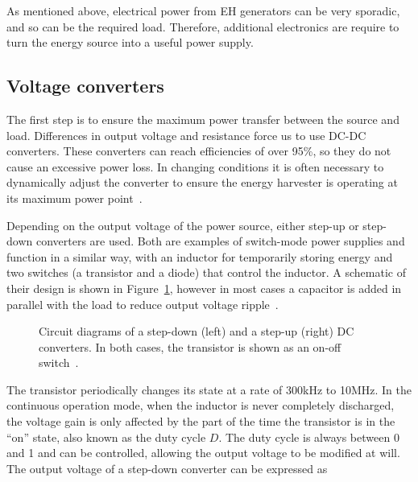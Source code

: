 \documentclass[a4paper,10pt]{article}
\begin{document}
As mentioned above, electrical power from \ac{EH} generators can be very sporadic, and so can be the required load. Therefore, additional electronics are require to turn the energy source into a useful power supply. 

\subsection{Voltage converters}

The first step is to ensure the maximum power transfer between the source and load. Differences in output voltage and resistance force us to use DC-DC converters. These converters can reach efficiencies of over 95\%, so they do not cause an excessive power loss. In changing conditions it is often necessary to dynamically adjust the converter to ensure the energy harvester is operating at its maximum power point~\cite{solar-mppt-ieee}. 

Depending on the output voltage of the power source, either step-up or step-down converters are used. Both are examples of switch-mode power supplies and function in a similar way, with an inductor for temporarily storing energy and two switches (a transistor and a diode) that control the inductor. A schematic of their design is shown in Figure~\ref{fig:converters}, however in most cases a capacitor is added in parallel with the load to reduce output voltage ripple~\cite{wiki:dcdc}. 

\begin{figure}[h!]
\centering
\caption{Circuit diagrams of a step-down (left) and a step-up (right) DC converters. In both cases, the transistor is shown as an on-off switch~\cite{wiki:dcdc}.}
\label{fig:converters}
\end{figure}

The transistor periodically changes its state at a rate of 300kHz to 10MHz. In the continuous operation mode, when the inductor is never completely discharged, the voltage gain is only affected by the part of the time the transistor is in the ``on'' state, also known as the duty cycle $D$. The duty cycle is always between 0 and 1 and can be controlled, allowing the output voltage to be modified at will. The output voltage of a step-down converter can be expressed as
\end{document}
